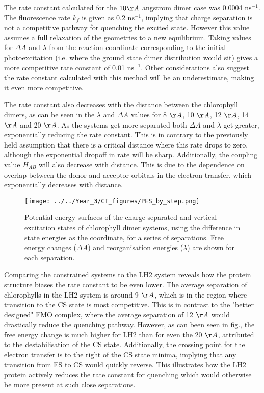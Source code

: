 The rate constant calculated for the $10\AA{}$ angstrom dimer case was 0.0004 $\text{ns}^{-1}$.
The fluorescence rate $k_f$ is given as 0.2 $\text{ns}^{-1}$, implying that charge
separation is not a competitive pathway for quenching the excited state. However
this value assumes a full relaxation of the geometries to a new equilibrium. Taking
values for $\Delta A$ and $\lambda$ from the reaction coordinate corresponding to
the initial photoexcitation (i.e. where the ground state dimer distribution would
sit) gives a more competitive rate constant of 0.01 $\text{ns}^{-1}$. Other considerations
also suggest the rate constant calculated with this method will be an underestimate, 
making it even more competitive.

The rate constant also decreases with the distance between the chlorophyll dimers, as can
be seen in the $\lambda$ and $\Delta A$ values for 8 $\AA{}$, 10 $\AA{}$, 12 $\AA{}$,
14 $\AA{}$ and 20 $\AA{}$. As the systems get more separated both $\Delta A$ and
$\lambda$ get greater, exponentially reducing the rate constant. This is in contrary
to the previously held assumption that there is a critical distance where this rate
drops to zero, although the exponential dropoff in rate will be sharp. Additionally, 
the coupling value $H_{AB}$ will also decrease with distance. This is due to the
dependence on overlap between the donor and acceptor orbitals in the electron transfer, 
which exponentially decreases with distance.

\begin{figure}
    \centering
    \texttt{[image: ../../Year\_3/CT\_figures/PES\_by\_step.png]}
    \label{fig:ct_pes_distance}
    \caption{Potential energy surfaces of the charge separated and vertical excitation
    states of chlorophyll dimer systems, using the difference in state energies 
    as the coordinate, for a series of separations. Free energy changes ($\Delta A$)
    and reorganisation energies ($\lambda$) are shown for each separation.}
\end{figure}

Comparing the constrained systems to the LH2 system reveals how the protein structure
biases the rate constant to be even lower. The average separation of chlorophylls
in the LH2 system is around 9 $\AA{}$, which is in the region where transition to
the CS state is most competitive. This is in contrast to the "better designed" FMO
complex, where the average separation of 12 $\AA{}$ would drastically reduce the
quenching pathway. However, as can been seen in fig., the free energy change is
much higher for LH2 than for even the 20 $\AA{}$, attributed to the destabilisation
of the CS state. Additionally, the crossing point for the electron transfer is to the
right of the CS state minima, implying that any transition from ES to CS would 
quickly reverse. This illustrates how the LH2 protein actively reduces the rate
constant for quenching which would otherwise be more present at such close separations.

